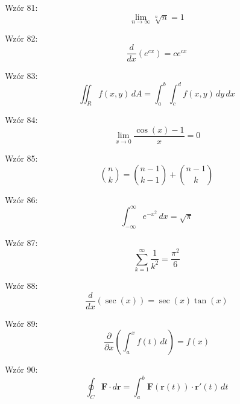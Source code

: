 \documentclass{article}
\begin{document}
Wzór 81:
\[ \lim_{{n \to \infty}} \sqrt[n]{n} = 1 \]

Wzór 82:
\[ \frac{d}{dx}\left(e^{cx}\right) = c e^{cx} \]

Wzór 83:
\[ \iint_R f(x,y) \,dA = \int_{a}^{b} \int_{c}^{d} f(x,y) \,dy\,dx \]

Wzór 84:
\[ \lim_{{x \to 0}} \frac{\cos(x) - 1}{x} = 0 \]

Wzór 85:
\[ \binom{n}{k} = \binom{n-1}{k-1} + \binom{n-1}{k} \]

Wzór 86:
\[ \int_{-\infty}^{\infty} e^{-x^2} \,dx = \sqrt{\pi} \]

Wzór 87:
\[ \sum_{k=1}^{\infty} \frac{1}{k^2} = \frac{\pi^2}{6} \]

Wzór 88:
\[ \frac{d}{dx}\left(\sec(x)\right) = \sec(x) \tan(x) \]

Wzór 89:
\[ \frac{\partial}{\partial x}\left(\int_{a}^{x} f(t) \,dt\right) = f(x) \]

Wzór 90:
\[ \oint_C \mathbf{F} \cdot d\mathbf{r} = \int_{a}^{b} \mathbf{F}(\mathbf{r}(t)) \cdot \mathbf{r}'(t) \,dt \]
\end{document}
